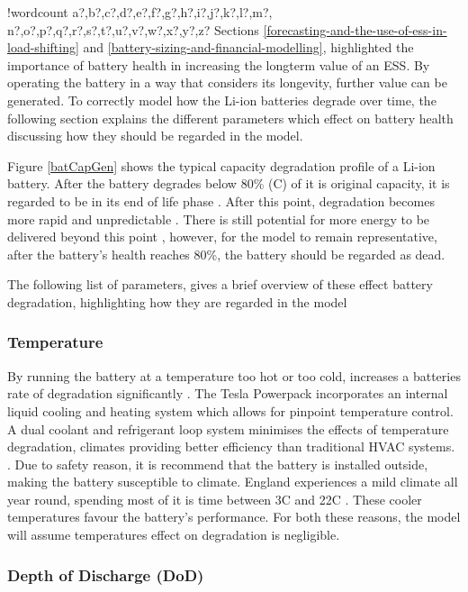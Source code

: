 \documentclass[fontsize=9.5pt]{extarticle}
\numberwithin{figure}{section} %
\newcounter{words}
\newenvironment{counted}{%
  \setcounter{words}{0}
  \SearchList!{wordcount}{\stepcounter{words}}
    {a?,b?,c?,d?,e?,f?,g?,h?,i?,j?,k?,l?,m?,
    n?,o?,p?,q?,r?,s?,t?,u?,v?,w?,x?,y?,z?}
  \UndoBoundary{'}
  \SearchOrder{p;}}{%
  \StopSearching}
\begin{document}
\begin{counted}
Sections \ref{forecasting-and-the-use-of-ess-in-load-shifting} and
\ref{battery-sizing-and-financial-modelling}, highlighted the importance
of battery health in increasing the longterm value of an ESS. By
operating the battery in a way that considers its longevity, further
value can be generated. To correctly model how the Li-ion batteries
degrade over time, the following section explains the different
parameters which effect on battery health discussing how they should be
regarded in the model.

Figure \ref{batCapGen} shows the typical capacity degradation profile of
a Li-ion battery. After the battery degrades below 80\% (C) of it is
original capacity, it is regarded to be in its end of life phase
\cite{REIEC61465:online}. After this point, degradation becomes more
rapid and unpredictable \cite{spotnitz2003simulation}. There is still
potential for more energy to be delivered beyond this point
\cite{Renaultt62:online}, however, for the model to remain
representative, after the battery's health reaches 80\%, the battery
should be regarded as dead.

The following list of parameters, gives a brief overview of these effect
battery degradation, highlighting how they are regarded in the model

\subsubsection{Temperature}\label{temperature}

By running the battery at a temperature too hot or too cold, increases a
batteries rate of degradation significantly \cite{rong2006analytical}.
The Tesla Powerpack incorporates an internal liquid cooling and heating
system which allows for pinpoint temperature control. A dual coolant and
refrigerant loop system minimises the effects of temperature
degradation, climates providing better efficiency than traditional HVAC
systems. \cite{Powerpac95:online}. Due to safety reason, it is recommend
that the battery is installed outside, making the battery susceptible to
climate. England experiences a mild climate all year round, spending
most of it is time between 3\degree C and 22\degree C
\cite{WeatherA0:online}. These cooler temperatures favour the battery's
performance. For both these reasons, the model will assume temperatures
effect on degradation is negligible.

\subsubsection{Depth of Discharge (DoD)}\label{depth-of-discharge-dod}


\end{counted}
\end{document}
